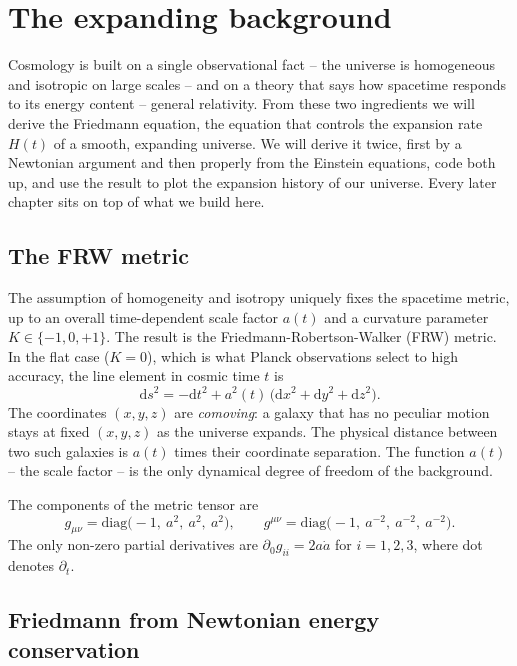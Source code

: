 \section{The expanding background}
\label{ch:background}

Cosmology is built on a single observational fact -- the universe is homogeneous and isotropic on large scales -- and on a theory that says how spacetime responds to its energy content -- general relativity. From these two ingredients we will derive the Friedmann equation, the equation that controls the expansion rate $H(t)$ of a smooth, expanding universe. We will derive it twice, first by a Newtonian argument and then properly from the Einstein equations, code both up, and use the result to plot the expansion history of our universe. Every later chapter sits on top of what we build here.

\subsection{The FRW metric}

The assumption of homogeneity and isotropy uniquely fixes the spacetime metric, up to an overall time-dependent scale factor $a(t)$ and a curvature parameter $K \in \{-1, 0, +1\}$. The result is the Friedmann-Robertson-Walker (FRW) metric. In the flat case ($K = 0$), which is what Planck observations select to high accuracy, the line element in cosmic time $t$ is
\begin{equation}
  \mathrm{d}s^2 = -\mathrm{d}t^2 + a^2(t)\,\bigl(\mathrm{d}x^2 + \mathrm{d}y^2 + \mathrm{d}z^2\bigr).
  \label{eq:FRW_cosmic}
\end{equation}
The coordinates $(x, y, z)$ are \emph{comoving}: a galaxy that has no peculiar motion stays at fixed $(x, y, z)$ as the universe expands. The physical distance between two such galaxies is $a(t)$ times their coordinate separation. The function $a(t)$ -- the scale factor -- is the only dynamical degree of freedom of the background.

The components of the metric tensor are
\[
  g_{\mu\nu} = \mathrm{diag}\bigl(-1,\ a^2,\ a^2,\ a^2\bigr),
  \qquad
  g^{\mu\nu} = \mathrm{diag}\bigl(-1,\ a^{-2},\ a^{-2},\ a^{-2}\bigr).
\]
The only non-zero partial derivatives are $\partial_0 g_{ii} = 2 a \dot{a}$ for $i = 1, 2, 3$, where dot denotes $\partial_t$.

\subsection{Friedmann from Newtonian energy conservation}

